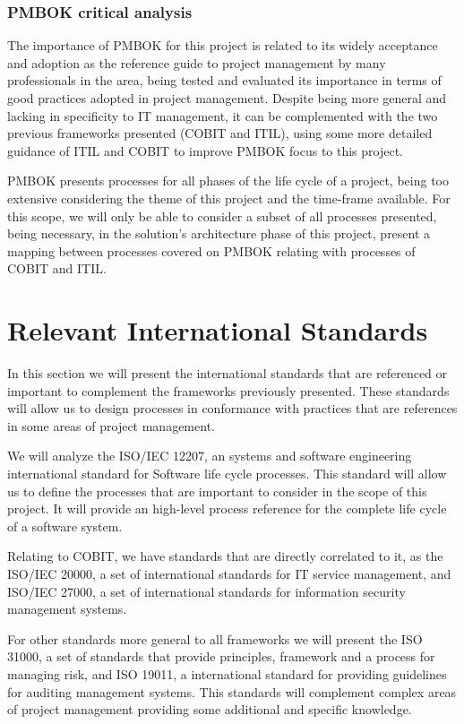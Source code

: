 \subsubsection{PMBOK critical analysis}

The importance of PMBOK for this project is related to its widely acceptance and adoption as the reference guide to project management by many professionals in the area, being tested and evaluated its importance in terms of good practices adopted in project management. Despite being more general and lacking in specificity to IT management, it can be complemented with the two previous frameworks presented (COBIT and ITIL), using some more detailed guidance of ITIL and COBIT to improve PMBOK focus to this project.\par
PMBOK presents processes for all phases of the life cycle of a project, being too extensive considering the theme of this project and the time-frame available. For this scope, we will only be able to consider a subset of all processes presented, being necessary, in the solution's architecture phase of this project, present a mapping between processes covered on PMBOK relating with processes of COBIT and ITIL.


\section{Relevant International Standards}

In this section we will present the international standards that are referenced or important to complement the frameworks previously presented. These standards will allow us to design processes in conformance with practices that are references in some areas of project management.\par
We will analyze the ISO/IEC 12207\cite{ISO12207}, an systems and software engineering international standard for Software life cycle processes. This standard will allow us to define the processes that are important to consider in the scope of this project. It will provide an high-level process reference for the complete life cycle of a software system.\par
Relating to COBIT, we have standards that are directly correlated to it, as the ISO/IEC 20000\cite{ISO20000-1,ISO20000-2,ISO20000-3,ISO20000-4,ISO20000-5}, a set of international standards for IT service management, and ISO/IEC 27000\cite{ISO27000}, a set of international standards for information security management systems.\par
For other standards more general to all frameworks we will present the ISO 31000\cite{ISO31000,IEC31010}, a set of standards that provide principles, framework and a process for managing risk, and ISO 19011\cite{ISO19011}, a international standard for providing guidelines for auditing management systems. This standards will complement complex areas of project management providing some additional and specific knowledge.

